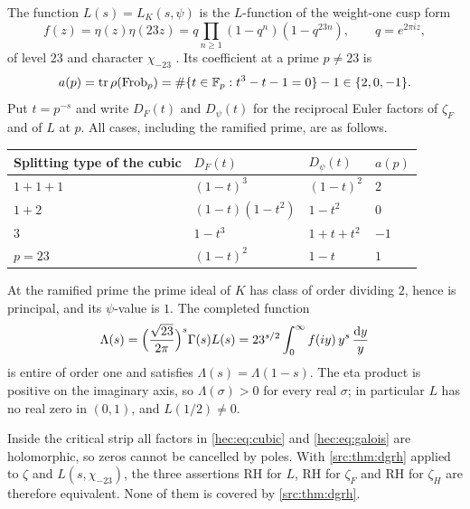 The function $L(s)=L_K(s,\psi)$ is the $L$-function of the weight-one cusp form
\begin{equation}\label{hec:eq:eta23}
 f(z)=\eta(z)\eta(23z)=q\prod_{n\ge1}(1-q^n)(1-q^{23n}),\qquad q=e^{2\pi iz},
\end{equation}
of level $23$ and character $\chi_{-23}$
\cite{Zagier2008Elliptic,Serre2003Jordan,KhareLaRosaWiese2023Splitting,LMFDBDatabase}. Its coefficient at
a prime $p\ne23$ is
\[
 a(p)=\operatorname{tr}\rho(\operatorname{Frob}_p)=\#\{t\in\mathbb{F}_p: t^3-t-1=0\}-1\in\{2,0,-1\}.
\]
Put $t=p^{-s}$ and write $D_F(t)$ and $D_\psi(t)$ for the reciprocal Euler factors of $\zeta_F$ and of
$L$ at $p$. All cases, including the ramified prime, are as follows.
\begin{center}
\begin{tabular}{llll}
\toprule
Splitting type of the cubic & $D_F(t)$ & $D_\psi(t)$ & $a(p)$\\
\midrule
$1+1+1$ & $(1-t)^3$ & $(1-t)^2$ & $2$\\
$1+2$ & $(1-t)(1-t^2)$ & $1-t^2$ & $0$\\
$3$ & $1-t^3$ & $1+t+t^2$ & $-1$\\
$p=23$ & $(1-t)^2$ & $1-t$ & $1$\\
\bottomrule
\end{tabular}
\end{center}
At the ramified prime the prime ideal of $K$ has class of order dividing $2$, hence is principal, and its
$\psi$-value is $1$. The completed function
\begin{equation}\label{hec:eq:Lambda23}
 \Lambda(s)=\Bigl(\frac{\sqrt{23}}{2\pi}\Bigr)^{s}\Gamma(s)L(s)
 =23^{s/2}\int_0^\infty f(iy)\,y^{s}\,\frac{\mathrm{d} y}{y}
\end{equation}
is entire of order one and satisfies $\Lambda(s)=\Lambda(1-s)$. The eta product is positive on the
imaginary axis, so $\Lambda(\sigma)>0$ for every real $\sigma$; in particular $L$ has no real zero in
$(0,1)$, and $L(1/2)\ne0$.

Inside the critical strip all factors in \eqref{hec:eq:cubic} and \eqref{hec:eq:galois} are holomorphic, so
zeros cannot be cancelled by poles. With \cref{src:thm:dgrh} applied to $\zeta$ and $L(s,\chi_{-23})$, the
three assertions RH for $L$, RH for $\zeta_F$ and RH for $\zeta_H$ are therefore equivalent. None of them
is covered by \cref{src:thm:dgrh}.

